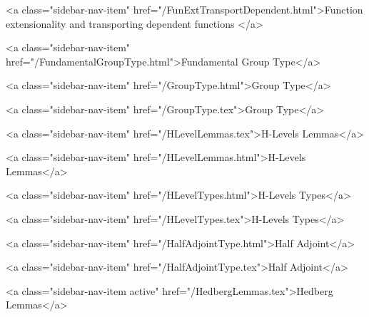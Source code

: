           <a class="sidebar-nav-item" href="/FunExtTransportDependent.html">Function extensionality and transporting dependent functions </a>
        
      
    
      
        
          <a class="sidebar-nav-item" href="/FundamentalGroupType.html">Fundamental Group Type</a>
        
      
    
      
        
          <a class="sidebar-nav-item" href="/GroupType.html">Group Type</a>
        
      
    
      
        
          <a class="sidebar-nav-item" href="/GroupType.tex">Group Type</a>
        
      
    
      
        
          <a class="sidebar-nav-item" href="/HLevelLemmas.tex">H-Levels Lemmas</a>
        
      
    
      
        
          <a class="sidebar-nav-item" href="/HLevelLemmas.html">H-Levels Lemmas</a>
        
      
    
      
        
          <a class="sidebar-nav-item" href="/HLevelTypes.html">H-Levels Types</a>
        
      
    
      
        
          <a class="sidebar-nav-item" href="/HLevelTypes.tex">H-Levels Types</a>
        
      
    
      
        
          <a class="sidebar-nav-item" href="/HalfAdjointType.html">Half Adjoint</a>
        
      
    
      
        
          <a class="sidebar-nav-item" href="/HalfAdjointType.tex">Half Adjoint</a>
        
      
    
      
        
          <a class="sidebar-nav-item active" href="/HedbergLemmas.tex">Hedberg Lemmas</a>
        
      
    
